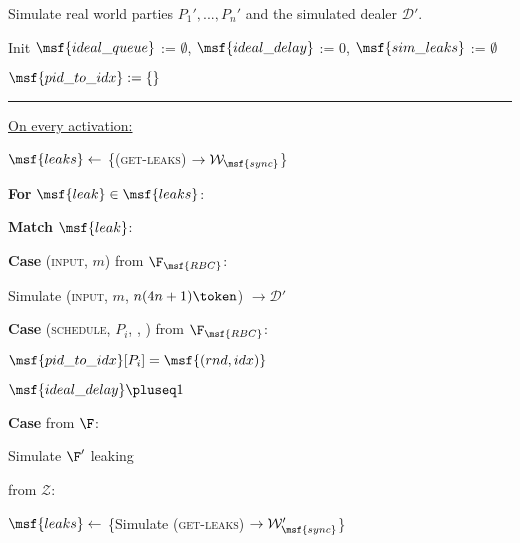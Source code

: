 
\begin{bbox}[title={Simulator $\mathcal{S}_\msf{Bracha} (\mathcal{D}, \mathcal{P}, \Delta)$}]

Simulate real world parties $P_1',...,P_n'$ and the simulated dealer $\mathcal{D}'$.

Init $\msf{ideal\_queue}$ := $\emptyset$, $\msf{ideal\_delay}$ := $0$, $\msf{sim\_leaks}$ := $\emptyset$

$\msf{pid\_to\_idx} := \{\}$

\vspace{2mm} \hrule \vspace{2mm}

\underline{On every activation:} \vspace{2mm}

\begin{renumerate}
	\item $\msf{leaks} \leftarrow$ \{\Send (\textsc{get-leaks}) $\rightarrow \mathcal{W}_\msf{sync}$\}
	
	\item {\bf For} $\msf{leak} \in \msf{leaks}$:
	\begin{renumerate}
		\item {\bf Match} $\msf{leak}$:
			\begin{renumerate}
				
				\item {\bf Case} (\textsc{input}, $m$) from $\F_\msf{RBC}$:

				\quad Simulate (\textsc{input}, $m$, $n(4n+1) \token$) $\rightarrow \mathcal{D}'$ 

				\item {\bf Case} (\textsc{schedule}, $P_i$, , ) from $\F_\msf{RBC}$:

					\quad $\msf{pid\_to\_idx}[P_i] = \msf{(rnd, idx)}$

					\quad $\msf{ideal\_delay} \pluseq 1$

				\item {\bf Case}  from $\F$:
					
					\quad Simulate $\F'$ leaking 
			\end{renumerate}
		\end{renumerate}
	\end{renumerate}


\OnInput {} from $\mathcal{Z}$:
	\begin{renumerate}
	\item $\msf{leaks} \leftarrow$ \{Simulate (\textsc{get-leaks}) $\rightarrow \mathcal{W}'_\msf{sync}$\}
	

\end{renumerate}
\end{bbox}
